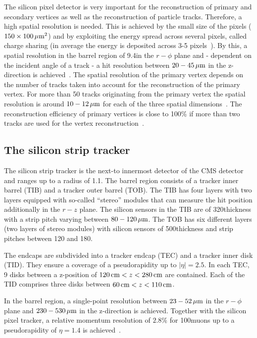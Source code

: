 The silicon pixel detector is very important for the reconstruction of primary and secondary vertices as well as the reconstruction of particle tracks.
Therefore, a high spatial resolution is needed.
This is achieved by the small size of the pixels ($ 150 \times 100 \,\mu\text{m}^2$) and by exploiting the energy spread across several pixels, called charge sharing (in average the energy is deposited across 3-5 pixels~\cite{bib:TWIKI:PixelClusterSize}).
By this, a spatial resolution in the barrel region of 9.4\mum in the $r - \phi$ plane and - dependent on the incident angle of a track - a hit resolution between $20-45\,\mu\text{m}$ in the z-direction is achieved~\cite{bib:CMS:tracking_8TeV}. 
The spatial resolution of the primary vertex depends on the number of tracks taken into account for the reconstruction of the primary vertex.
For more than 50 tracks originating from the primary vertex the spatial resolution is around $10-12\,\mu\text{m}$ for each of the three spatial dimensions~\cite{bib:CMS:tracking_8TeV}.
The reconstruction efficiency of primary vertices is close to 100\% if more than two tracks are used for the vertex reconstruction~\cite{bib:CMS:tracking_8TeV}.

\subsection*{The silicon strip tracker}
The silicon strip tracker is the next-to innermost detector of the CMS detector and ranges up to a radius of 1.1\m.
The barrel region consists of a tracker inner barrel (TIB) and a tracker outer barrel (TOB).
The TIB has four layers with two layers equipped with so-called ``stereo'' modules that can measure the hit position additionally in the $r-z$ plane.
The silicon sensors in the TIB are of 320\mum thickness with a strip pitch varying between $80-120\,\mu\text{m}$.
The TOB has six different layers (two layers of stereo modules) with silicon sensors of 500\mum thickness and strip pitches between 120 and 180\mum. 

The endcaps are subdivided into a tracker endcap (TEC) and a tracker inner disk (TID).
They ensure a coverage of a pseudorapidity up to $|\eta|=2.5$.
In each TEC, 9 disks between a z-position of $120\,\text{cm} < z < 280\,\text{cm}$ are contained.
Each of the TID comprises three disks between $60\,\text{cm} < z < 110\,\text{cm}$.

In the barrel region, a single-point resolution between $23 - 52\,\mu\text{m}$ in the $r-\phi$ plane and $230 - 530\,\mu\text{m}$  in the z-direction is achieved.
Together with the silicon pixel tracker, a relative momentum resolution of $2.8\%$ for 100\gev muons up to a pseudorapidity of $\eta = 1.4$ is achieved~\cite{bib:CMS:tracking_8TeV}.


